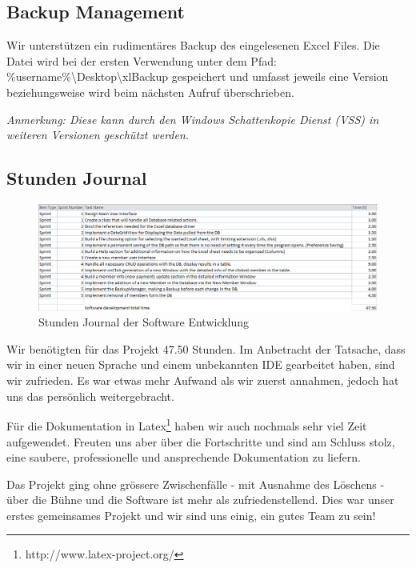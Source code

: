 \documentclass{article}
\begin{document}
\subsection{Backup Management}
Wir unterstützen ein rudimentäres Backup des eingelesenen Excel Files. Die Datei wird bei der ersten Verwendung unter dem Pfad: \%username\%\textbackslash Desktop\textbackslash xlBackup gespeichert und umfasst jeweils eine Version beziehungsweise wird beim nächsten Aufruf überschrieben.

\textit{Anmerkung: Diese kann durch den Windows Schattenkopie Dienst (VSS) in weiteren Versionen geschützt werden.}

\subsection{Stunden Journal}
\begin{figure}[h]
	\centering
	\includegraphics[width=1 \textwidth]{StundenJournal}
	\caption{Stunden Journal der Software Entwicklung}
\end{figure}

Wir benötigten für das Projekt 47.50 Stunden. Im Anbetracht der Tatsache, dass wir in einer neuen Sprache und einem unbekannten IDE gearbeitet haben, sind wir zufrieden. Es war etwas mehr Aufwand als wir zuerst annahmen, jedoch hat uns das persönlich weitergebracht.

Für die Dokumentation in Latex\footnote{http://www.latex-project.org/} haben wir auch nochmals sehr viel Zeit aufgewendet. Freuten uns aber über die Fortschritte und sind am Schluss stolz, eine saubere, professionelle und ansprechende Dokumentation zu liefern.

Das Projekt ging ohne grössere Zwischenfälle - mit Ausnahme des Löschens - über die Bühne und die Software ist mehr als zufriedenstellend. Dies war unser erstes gemeinsames Projekt und wir sind uns einig, ein gutes Team zu sein!
\newpage
\end{document}
